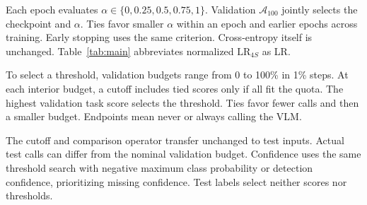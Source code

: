 Each epoch evaluates $\alpha\in\{0,0.25,0.5,0.75,1\}$. Validation $\mathcal A_{100}$ jointly selects the checkpoint and $\alpha$. Ties favor smaller $\alpha$ within an epoch and earlier epochs across training. Early stopping uses the same criterion. Cross-entropy itself is unchanged. Table~\ref{tab:main} abbreviates normalized $\mathrm{LR}_{4S}$ as LR.

To select a threshold, validation budgets range from 0 to 100\% in 1\% steps. At each interior budget, a cutoff includes tied scores only if all fit the quota. The highest validation task score selects the threshold. Ties favor fewer calls and then a smaller budget. Endpoints mean never or always calling the VLM.

The cutoff and comparison operator transfer unchanged to test inputs. Actual test calls can differ from the nominal validation budget. Confidence uses the same threshold search with negative maximum class probability or detection confidence, prioritizing missing confidence. Test labels select neither scores nor thresholds.
